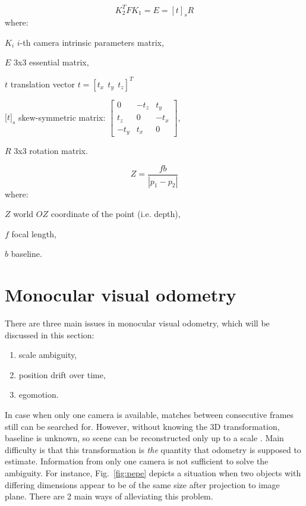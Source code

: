 \begin{equation}
K_{2}^{T}FK_{1}=E=[t]_{s}R
\label{eq:ess}
\end{equation}
where:
\begin{eqwhere}[2cm]
	\item[$K_{i}$] $i$-th camera intrinsic parameters matrix,
	\item[$E$] 3x3 essential matrix,
	\item[$t$] translation vector $t=[t_{x}\ \ t_{y}\ \ t_{z}]^T$
	\item[$\lbrack t \rbrack _{s}$] skew-symmetric matrix: $\begin{bmatrix}
		0 & -t_{z} & t_{y} \\ 
		t_{z} & 0 & -t_{x} \\ 
		-t_{y} & t_{x} & 0
	\end{bmatrix}$,
	\item[$R$] 3x3 rotation matrix.
\end{eqwhere}

\begin{equation}
Z = \frac{fb}{|p_{1}-p_{2}|}
\label{eq:disparity}
\end{equation}
where:
\begin{eqwhere}[2cm]
	\item[$Z$] world $OZ$ coordinate of the point (i.e. depth),
	\item[$f$] focal length,
	\item[$b$] baseline.
\end{eqwhere}


\section{Monocular visual odometry}
\label{sec:mono}

There are three main issues in monocular visual odometry, which will be discussed in this section:
\begin{enumerate}
	\item scale ambiguity,
	\item position drift over time,
	\item egomotion.
\end{enumerate}

In case when only one camera is available, matches between consecutive frames still can be searched for. However, without knowing the 3D transformation, baseline is unknown, so scene can be reconstructed only up to a scale \cite{hartley2003multiple} \cite{szeliski}. Main difficulty is that this transformation is \textit{the} quantity that odometry is supposed to estimate. Information from only one camera is not sufficient to solve the ambiguity. For instance, Fig.~\ref{fig:pepe} depicts a situation when two objects with differing dimensions appear to be of the same size after projection to image plane. There are 2 main ways of alleviating this problem.


